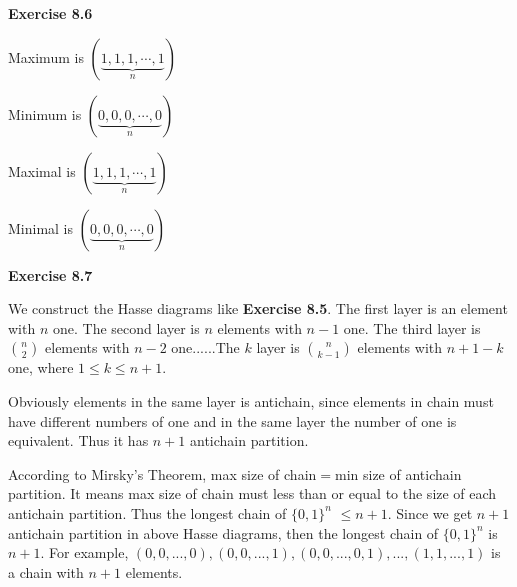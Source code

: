 \documentclass{article} %
\begin{document}
	\textbf{Exercise 8.6}\par
	Maximum is $(\underbrace{1,1,1,\cdots,1}_{n})$\par
	Minimum is $(\underbrace{0,0,0,\cdots,0}_{n})$\par
	Maximal is  $(\underbrace{1,1,1,\cdots,1}_{n})$\par
	Minimal is $(\underbrace{0,0,0,\cdots,0}_{n})$\par
	\textbf{Exercise 8.7}\par
	We construct the Hasse diagrams like \textbf{Exercise 8.5}. 
	The first layer is an element with $n$ one. The second layer is $n$ elements with $n-1$ one.
	The third layer is $\binom{n}{2}$ elements with $n-2$ one......The $k$ layer is $\binom{n}{k-1}$ elements with $n+1-k$ one, where $1\leq k\leq n+1$.\par
	Obviously elements in the same layer is antichain, since elements in chain must have different numbers of one and in the same layer the number of one is equivalent.
	Thus it has $n+1$ antichain partition.\par
	According to Mirsky's Theorem, max size of chain$=$min size of antichain partition. It means max size of chain must less than or equal to the size of each antichain partition. 
	Thus the longest chain of ${\{0,1\}}^n$ $\leq n+1$. Since we get $n+1$ antichain partition in above Hasse diagrams, then the longest chain of ${\{0,1\}}^n$ is $n+1$. 
	For example, $(0,0,...,0), (0,0,...,1), (0,0,...,0,1),...,(1,1,...,1)$ is a chain with $n+1$ elements.\par
	

	
\end{document}
